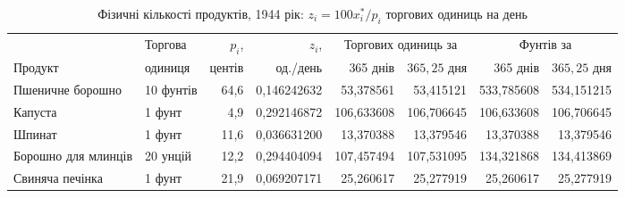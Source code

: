 \begin{table}[htbp]
\centering\footnotesize\setlength{\tabcolsep}{3pt}
\caption{Фізичні кількості продуктів, 1944 рік: $z_i=100x_i^*/p_i$ торгових одиниць на день}
\label{tab:glpk-units-1944}
\begin{tabular}{llrrrrrr}
\toprule
 & Торгова & $p_i$, & $z_i$, & \multicolumn{2}{c}{Торгових одиниць за} & \multicolumn{2}{c}{Фунтів за} \\
\cmidrule(lr){5-6}\cmidrule(lr){7-8}
Продукт & одиниця & центів & од./день & 365 днів & $365{,}25$ дня & 365 днів & $365{,}25$ дня \\
\midrule
Пшеничне борошно & 10 фунтів & 64{,}6 & 0{,}146242632 & 53{,}378561 & 53{,}415121 & 533{,}785608 & 534{,}151215 \\
Капуста & 1 фунт & 4{,}9 & 0{,}292146872 & 106{,}633608 & 106{,}706645 & 106{,}633608 & 106{,}706645 \\
Шпинат & 1 фунт & 11{,}6 & 0{,}036631200 & 13{,}370388 & 13{,}379546 & 13{,}370388 & 13{,}379546 \\
Борошно для млинців & 20 унцій & 12{,}2 & 0{,}294404094 & 107{,}457494 & 107{,}531095 & 134{,}321868 & 134{,}413869 \\
Свиняча печінка & 1 фунт & 21{,}9 & 0{,}069207171 & 25{,}260617 & 25{,}277919 & 25{,}260617 & 25{,}277919 \\
\bottomrule
\end{tabular}
\end{table}
